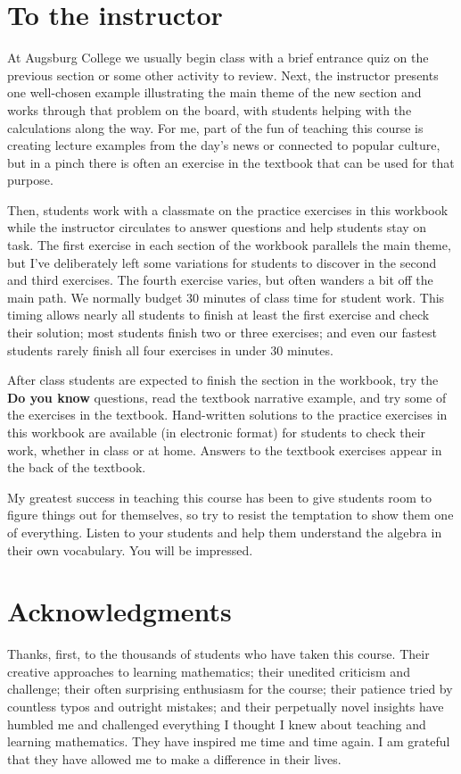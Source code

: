 \section*{To the instructor}
At Augsburg College we usually begin class with a brief entrance quiz on the previous section or some other activity to review.  Next, the instructor presents one well-chosen example illustrating the main theme of the new section and works through that problem on the board, with students helping with the calculations along the way. For me, part of the fun of teaching this course is creating lecture examples from the day's news or connected to popular culture, but in a pinch there is often an exercise in the textbook that can be used for that purpose.  

Then, students work with a classmate on the practice exercises in this workbook while the instructor circulates to answer questions and help students stay on task.  The first exercise in each section of the workbook parallels the main theme, but I've deliberately left some variations for students to discover in the second and third exercises.  The fourth exercise varies, but often wanders a bit off the main path.  We normally budget 30 minutes of class time for student work.  This timing allows nearly all students to finish at least the first exercise and check their solution; most students finish two or three exercises; and even our fastest students rarely finish all four exercises in under 30 minutes.

 After class students are expected to finish the section in the workbook, try the \textbf{Do you know} questions, read the textbook narrative example, and try some of the exercises in the textbook.  Hand-written solutions to the practice exercises in this workbook are available (in electronic format) for students to check their work, whether in class or at home.  Answers to the textbook exercises appear in the back of the textbook.  

My greatest success in teaching this course has been to give students room to figure things out for themselves, so try to resist the temptation to show them one of everything.   Listen to your students and help them understand the algebra in their own vocabulary.  You will be impressed.

\section*{Acknowledgments}

Thanks, first, to the thousands of students who have taken this course.  Their creative approaches to learning mathematics; their unedited criticism and challenge; their often surprising enthusiasm for the course; their patience tried by countless typos and outright mistakes; and their perpetually novel insights have humbled me and challenged everything I thought I knew about teaching and learning mathematics.  They have inspired me time and time again.  I am grateful that they have allowed me to make a difference in their lives.

